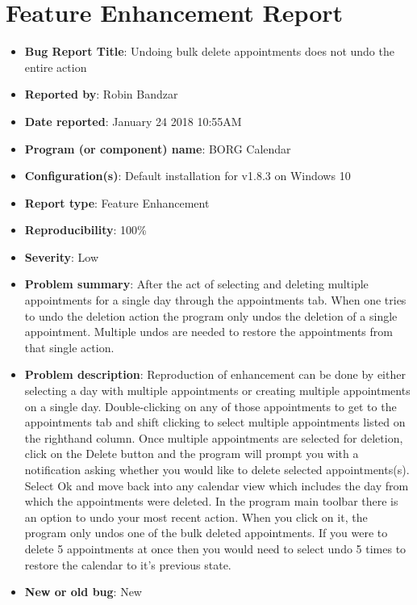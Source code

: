 \documentclass[fontsize=12pt,paper=letter,twoside]{scrartcl}
\begin{document}
\newpage
\section{Feature Enhancement Report}

\begin{itemize}
\item \textbf{Bug Report Title}: Undoing bulk delete appointments does not undo the entire action
\item \textbf{Reported by}: Robin Bandzar
\item \textbf{Date reported}: January 24 2018 10:55AM
\item \textbf{Program (or component) name}: BORG Calendar
\item \textbf{Configuration(s)}: Default installation for v1.8.3 on Windows 10
\item \textbf{Report type}: Feature Enhancement
\item \textbf{Reproducibility}: 100\%
\item \textbf{Severity}: Low
\item \textbf{Problem summary}: After the act of selecting and deleting multiple appointments for a single day through the appointments tab. When one tries to undo the deletion action the program only undos the deletion of a single appointment. Multiple undos are needed to restore the appointments from that single action.
\item \textbf{Problem description}: Reproduction of enhancement can be done by either selecting a day with multiple appointments or creating multiple appointments on a single day. Double-clicking on any of those appointments to get to the appointments tab and shift clicking to select multiple appointments listed on the righthand column. Once multiple appointments are selected for deletion, click on the Delete button and the program will prompt you with a notification asking whether you would like to delete selected appointments(s). Select Ok and move back into any calendar view which includes the day from which the appointments were deleted. In the program main toolbar there is an option to undo your most recent action. When you click on it, the program only undos one of the bulk deleted appointments. If you were to delete 5 appointments at once then you would need to select undo 5 times to restore the calendar to it's previous state.
\item \textbf{New or old bug}: New
\end{itemize}
\end{document}
